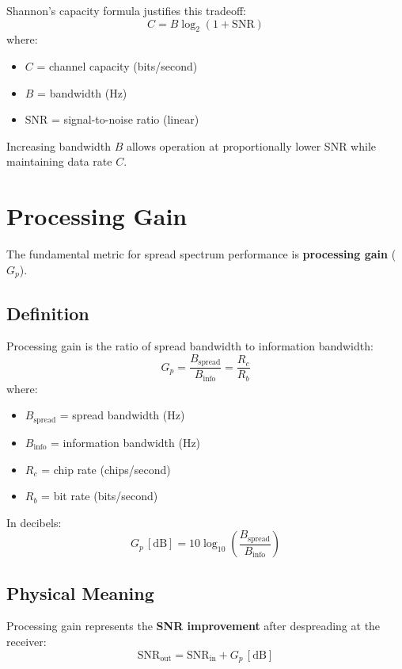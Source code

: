 Shannon's capacity formula justifies this tradeoff:
\begin{equation}
C = B \log_2(1 + \mathrm{SNR})
\end{equation}
where:
\begin{itemize}
\item $C$ = channel capacity (bits/second)
\item $B$ = bandwidth (Hz)
\item $\mathrm{SNR}$ = signal-to-noise ratio (linear)
\end{itemize}

Increasing bandwidth $B$ allows operation at proportionally lower SNR while maintaining data rate $C$.

\section{Processing Gain}

The fundamental metric for spread spectrum performance is \textbf{processing gain} ($G_p$).

\subsection{Definition}

Processing gain is the ratio of spread bandwidth to information bandwidth:
\begin{equation}
G_p = \frac{B_{\mathrm{spread}}}{B_{\mathrm{info}}} = \frac{R_c}{R_b}
\end{equation}
where:
\begin{itemize}
\item $B_{\mathrm{spread}}$ = spread bandwidth (Hz)
\item $B_{\mathrm{info}}$ = information bandwidth (Hz)
\item $R_c$ = chip rate (chips/second)
\item $R_b$ = bit rate (bits/second)
\end{itemize}

In decibels:
\begin{equation}
G_p\,[\mathrm{dB}] = 10\log_{10}\left(\frac{B_{\mathrm{spread}}}{B_{\mathrm{info}}}\right)
\end{equation}

\subsection{Physical Meaning}

Processing gain represents the \textbf{SNR improvement} after despreading at the receiver:
\begin{equation}
\mathrm{SNR}_{\mathrm{out}} = \mathrm{SNR}_{\mathrm{in}} + G_p\,[\mathrm{dB}]
\end{equation}

